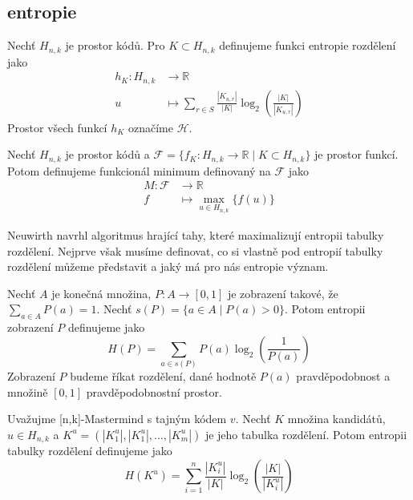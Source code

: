 

\subsection{entropie}
\begin{definice}
    Nechť $H_{n,k}$ je prostor kódů. Pro $K \subset H_{n,k}$ definujeme funkci entropie rozdělení jako
    \begin{align*}
        h_K \colon H_{n,k} &\to \mathbb{R} \\
        u &\mapsto \sum_{r\in S} \frac{|K_{u,r}|}{|K|}\log_2\left( \frac{|K|}{|K_{u,r}|} \right)
    \end{align*}
    Prostor všech funkcí $h_K$ označíme $\mathcal{H}$. 
\end{definice}

\begin{definice}
    Nechť $H_{n,k}$ je prostor kódů a $\mathcal{F} = \{f_K\colon H_{n,k} \to \mathbb{R} \mid K \subset H_{n,k}\}$ je prostor funkcí. Potom definujeme funkcionál minimum definovaný na $\mathcal{F}$ jako
    \begin{align*}
        M \colon \mathcal{F} &\to \mathbb{R} \\
        f &\mapsto \max_{u\in H_{n,k}}\{f(u)\}
    \end{align*}
\end{definice}

Neuwirth \cite{neuwirth} 
navrhl algoritmus hrající tahy, které maximalizují entropii tabulky rozdělení. Nejprve však musíme definovat, co si vlastně pod entropií tabulky rozdělení můžeme představit a jaký má pro nás entropie význam.

\begin{definice}[Entropie]\label{defentropie}
  Nechť $A$ je konečná množina, $P \colon A \to [0,1]$ je zobrazení takové, že $\sum_{a \in A} P(a) = 1$. Nechť $s(P) = \{ a \in A \mid P(a) > 0\}$. Potom entropii zobrazení $P$ definujeme jako 
  \[H(P) = \sum_{a \in s(P)}P(a)\log_2\left(\frac{1}{P(a)}\right)\]
  Zobrazení $P$ budeme říkat rozdělení, dané hodnotě $P(a)$ pravděpodobnost a množině $[0,1]$ pravděpodobnostní prostor. 
\end{definice}

\begin{definice}\label{defentropietabrozdel}
  Uvažujme [n,k]-Mastermind s tajným kódem $v$. Nechť $K$ množina kandidátů, $u \in H_{n,k}$ a $K^u = (|K^u_1|, |K^u_1|, \dots, |K^u_m|)$ je jeho tabulka rozdělení. Potom entropii tabulky rozdělení definujeme jako
  \[H(K^u) = \sum_{i=1}^n \frac{|K^u_i|}{|K|}\log_2\left( \frac{|K|}{|K^u_i|} \right)\]
\end{definice}

